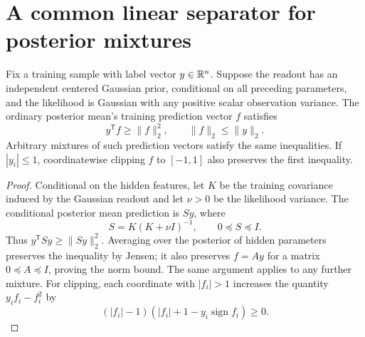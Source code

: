 \section{A common linear separator for posterior mixtures}

\begin{lemma}
\label{lem:sector}
Fix a training sample with label vector $y\in\mathbb R^n$. Suppose the readout has an independent centered Gaussian prior, conditional on all preceding parameters, and the likelihood is Gaussian with any positive scalar observation variance. The ordinary posterior mean's training prediction vector $f$ satisfies
\[
 y^{\mathsf T}f\ge\|f\|_2^2,\qquad \|f\|_2\le\|y\|_2.
\]
Arbitrary mixtures of such prediction vectors satisfy the same inequalities. If $|y_i|\le1$, coordinatewise clipping $f$ to $[-1,1]$ also preserves the first inequality.
\end{lemma}
\begin{proof}
Conditional on the hidden features, let $K$ be the training covariance induced by the Gaussian readout and let $\nu>0$ be the likelihood variance. The conditional posterior mean prediction is $Sy$, where
\[
 S=K(K+\nu I)^{-1},\qquad 0\preceq S\preceq I.
\]
Thus $y^{\mathsf T}Sy\ge\|Sy\|_2^2$. Averaging over the posterior of hidden parameters preserves the inequality by Jensen; it also preserves $f=Ay$ for a matrix $0\preceq A\preceq I$, proving the norm bound. The same argument applies to any further mixture. For clipping, each coordinate with $|f_i|>1$ increases the quantity $y_if_i-f_i^2$ by
\[
 (|f_i|-1)(|f_i|+1-y_i\operatorname{sign}f_i)\ge0.
\]
\end{proof}

